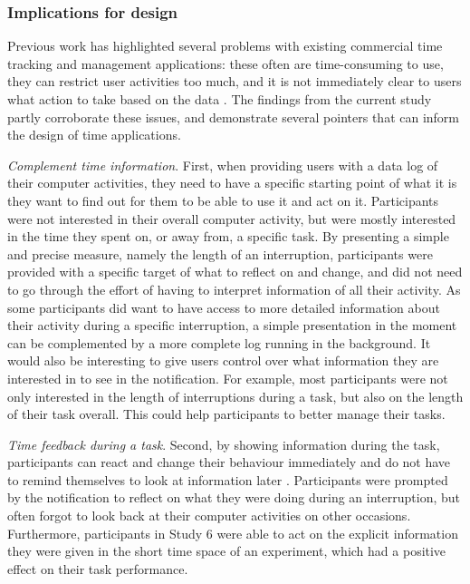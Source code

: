 \subsubsection{Implications for design}
Previous work has highlighted several problems with existing commercial time tracking and management applications: these often are time-consuming to use, they can restrict user activities too much, and it is not immediately clear to users what action to take based on the data \citep{Collins2014, Whittaker2016}. The findings from the current study partly corroborate these issues, and demonstrate several pointers that can inform the design of time applications. 

\textit{Complement time information}. First, when providing users with a data log of their computer activities, they need to have a specific starting point of what it is they want to find out for them to be able to use it and act on it. Participants were not interested in their overall computer activity, but were mostly interested in the time they spent on, or away from, a specific task. By presenting a simple and precise measure, namely the length of an interruption, participants were provided with a specific target of what to reflect on and change, and did not need to go through the effort of having to interpret information of all their activity. As some participants did want to have access to more detailed information about their activity during a specific interruption, a simple presentation in the moment can be complemented by a more complete log running in the background. It would also be interesting to give users control over what information they are interested in to see in the notification. For example, most participants were not only interested in the length of interruptions during a task, but also on the length of their task overall. This could help participants to better manage their tasks.

\textit{Time feedback during a task}. Second, by showing information during the task, participants can react and change their behaviour immediately and do not have to remind themselves to look at information later \citep{Gould2016, Maior2018}. Participants were prompted by the notification to reflect on what they were doing during an interruption, but often forgot to look back at their computer activities on other occasions. Furthermore, participants in Study 6 were able to act on the explicit information they were given in the short time space of an experiment, which had a positive effect on their task performance.

